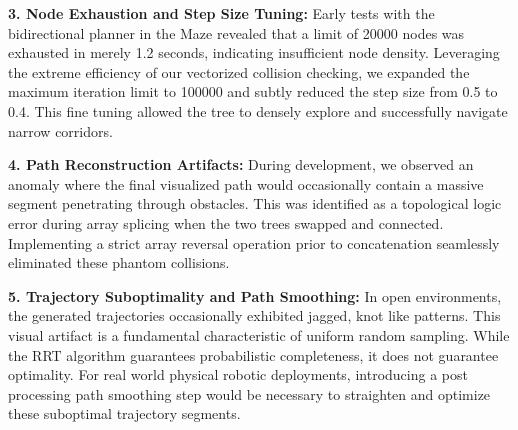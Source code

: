 \documentclass[letterpaper,journal]{IEEEtran}
\begin{document}
\textbf{3. Node Exhaustion and Step Size Tuning:}
Early tests with the bidirectional planner in the Maze revealed that a limit of 20000 nodes was exhausted in merely 1.2 seconds, indicating insufficient node density. Leveraging the extreme efficiency of our vectorized collision checking, we expanded the maximum iteration limit to 100000 and subtly reduced the step size from 0.5 to 0.4. This fine tuning allowed the tree to densely explore and successfully navigate narrow corridors.

\textbf{4. Path Reconstruction Artifacts:}
During development, we observed an anomaly where the final visualized path would occasionally contain a massive segment penetrating through obstacles. This was identified as a topological logic error during array splicing when the two trees swapped and connected. Implementing a strict array reversal operation prior to concatenation seamlessly eliminated these phantom collisions.

\textbf{5. Trajectory Suboptimality and Path Smoothing:}
In open environments, the generated trajectories occasionally exhibited jagged, knot like patterns. This visual artifact is a fundamental characteristic of uniform random sampling. While the RRT algorithm guarantees probabilistic completeness, it does not guarantee optimality. For real world physical robotic deployments, introducing a post processing path smoothing step would be necessary to straighten and optimize these suboptimal trajectory segments.
\end{document}
